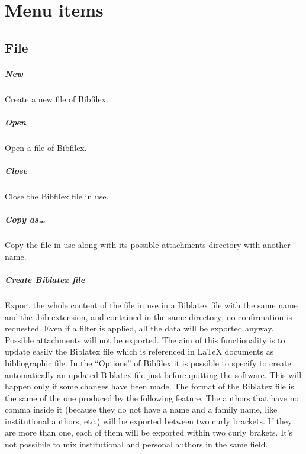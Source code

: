 \documentclass[a4paper,12pt]{report}
\begin{document}
\chapter{Menu items}

\section{File}

\paragraph{New} Create a new file of Bibfilex.

\paragraph{Open} Open a file of Bibfilex.

\paragraph{Close} Close the Bibfilex file in use.

\paragraph{Copy as\dots} Copy the file in use along with its possible attachments directory with another name.

\paragraph{Create Biblatex file} Export the whole content of the file in use in a Biblatex file with the same name and the .bib extension, and contained in the same directory; no confirmation is requested. Even if a filter is applied, all the data will be exported anyway. Possible attachments will not be exported. The aim of this functionality is to update easily the Biblatex file which is referenced in LaTeX documents as bibliographic file. In the “Options” of Bibfilex it is possible to specify to create automatically an updated Biblatex file just before quitting the software. This will happen only if some changes have been made. The format of the Biblatex file is the same of the one produced by the following feature. The authors that have no comma inside it (because they do not have a name and a family name, like institutional authors, etc.) will be exported between two curly brackets. If they are more than one, each of them will be exported within two curly brakets. It's not possibile to mix institutional and personal authors in the same field.
\end{document}
